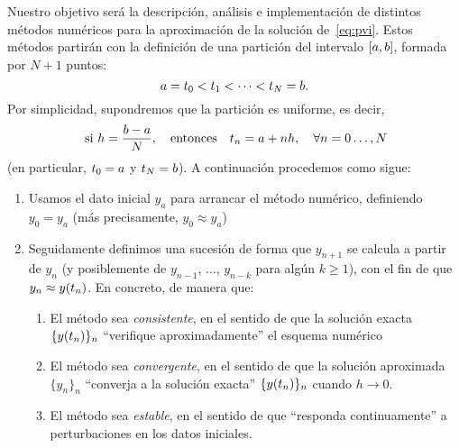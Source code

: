 Nuestro objetivo será la descripción, análisis e implementación de
distintos métodos numéricos para la aproximación de la solución
de~\eqref{eq:pvi}. Estos métodos partirán con la definición de una
partición del intervalo $[\ta,\tb]$, formada por $N+1$ puntos:
\begin{equation*}
  \ta=\tt_0 < \tt_1 < \cdots < \tt_N=\tb.
\end{equation*}
Por simplicidad, supondremos que la partición es uniforme, es decir,
\begin{equation*}
  \text{ si } h=\frac{b-a}{N}, \quad \text{entonces} \quad
  \tt_n=\ta+nh,\quad \forall n=0\dots,N
\end{equation*}
(en particular, $\tt_0=a$ y $\tt_N=b$). A continuación procedemos como
sigue:
\begin{enumerate}
\item Usamos el dato inicial $y_a$ para arrancar el método numérico,
  definiendo $y_0=y_a$ (más precisamente, $y_0\approx y_a$)
\item Seguidamente definimos una sucesión de forma que $y_{n+1}$ se
  calcula a partir de $y_n$ (y posiblemente de $y_{n-1}$, ...,
  $y_{n-k}$ para algún $k\ge 1$), con el fin de que
  $y_n\approx\sol(\tt_n)$. En concreto, de manera que:
  \begin{enumerate}
  \item El método sea \textit{consistente}, en el sentido de que la
    solución exacta $\{\sol(\tt_n)\}_n$ ``verifique aproximadamente'' el
    esquema numérico
  \item El método sea \textit{convergente}, en el sentido de que la
    solución aproximada $\{y_n\}_n$ ``converja a la solución exacta''
    $\{\sol(\tt_n)\}_n$ cuando $h\to 0$.
  \item El método sea \textit{estable}, en el sentido de que ``responda
    continuamente'' a perturbaciones en los datos iniciales.
  \end{enumerate}
\end{enumerate}

